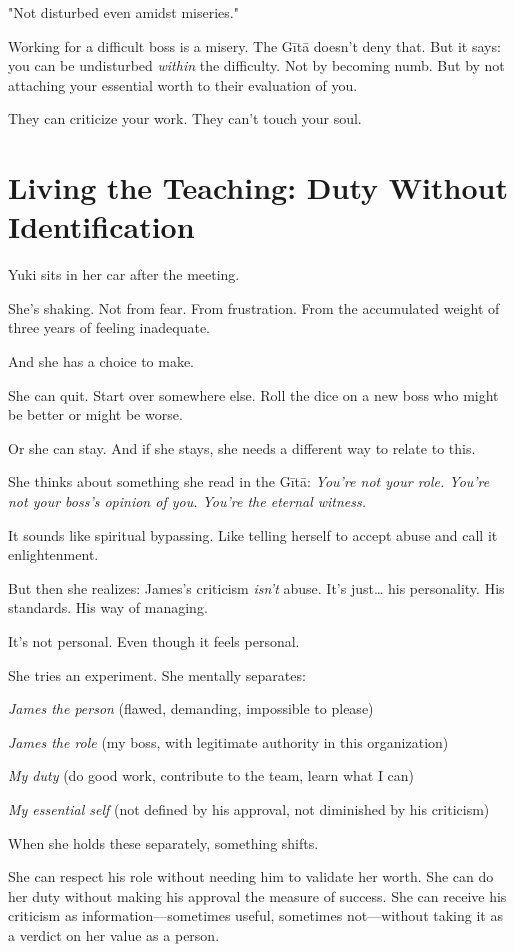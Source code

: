 \documentclass[11pt,twoside]{book}
\begin{document}
"Not disturbed even amidst miseries."

Working for a difficult boss is a misery. The Gītā doesn't deny that. But it says: you can be undisturbed \emph{within} the difficulty. Not by becoming numb. But by not attaching your essential worth to their evaluation of you.

They can criticize your work. They can't touch your soul.

\section*{Living the Teaching: Duty Without Identification}

Yuki sits in her car after the meeting.

She's shaking. Not from fear. From frustration. From the accumulated weight of three years of feeling inadequate.

And she has a choice to make.

She can quit. Start over somewhere else. Roll the dice on a new boss who might be better or might be worse.

Or she can stay. And if she stays, she needs a different way to relate to this.

She thinks about something she read in the Gītā: \emph{You're not your role. You're not your boss's opinion of you. You're the eternal witness.}

It sounds like spiritual bypassing. Like telling herself to accept abuse and call it enlightenment.

But then she realizes: James's criticism \emph{isn't} abuse. It's just\ldots{} his personality. His standards. His way of managing.

It's not personal. Even though it feels personal.

She tries an experiment. She mentally separates:

\emph{James the person} (flawed, demanding, impossible to please)

\emph{James the role} (my boss, with legitimate authority in this organization)

\emph{My duty} (do good work, contribute to the team, learn what I can)

\emph{My essential self} (not defined by his approval, not diminished by his criticism)

When she holds these separately, something shifts.

She can respect his role without needing him to validate her worth. She can do her duty without making his approval the measure of success. She can receive his criticism as information—sometimes useful, sometimes not—without taking it as a verdict on her value as a person.
\end{document}
